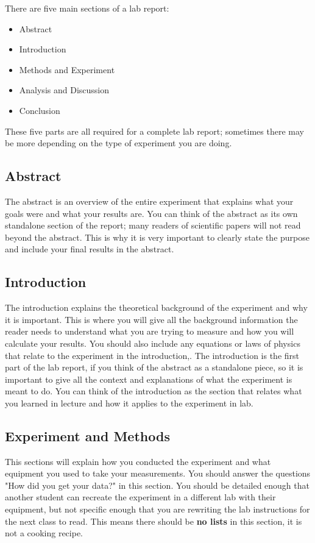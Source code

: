 \documentclass{article}
\begin{document}
There are five main sections of a lab report:
\begin{itemize}
    \item Abstract
    \item Introduction
    \item Methods and Experiment
    \item Analysis and Discussion
    \item Conclusion
\end{itemize}
These five parts are all required for a complete lab report; sometimes there may be more depending on the type of experiment you are doing. 

\subsection{Abstract}

The abstract is an overview of the entire experiment that explains what your goals were and what your results are. You can think of the abstract as its own standalone section of the report; many readers of scientific papers will not read beyond the abstract. This is why it is very important to clearly state the purpose and include your final results in the abstract. 

\subsection{Introduction}

The introduction explains the theoretical background of the experiment and why it is important. This is where you will give all the background information the reader needs to understand what you are trying to measure and how you will calculate your results. You should also include any equations or laws of physics that relate to the experiment in the introduction,. The introduction is the first part of the lab report, if you think of the abstract as a standalone piece, so it is important to give all the context and explanations of what the experiment is meant to do. You can think of the introduction as the section that relates what you learned in lecture and how it applies to the experiment in lab. 

\subsection{Experiment and Methods}

This sections will explain how you conducted the experiment and what equipment you used to take your measurements. You should answer the questions "How did you get your data?" in this section. You should be detailed enough that another student can recreate the experiment in a different lab with their equipment, but not specific enough that you are rewriting the lab instructions for the next class to read. This means there should be \textbf{no lists} in this section, it is not a cooking recipe. 
\end{document}
